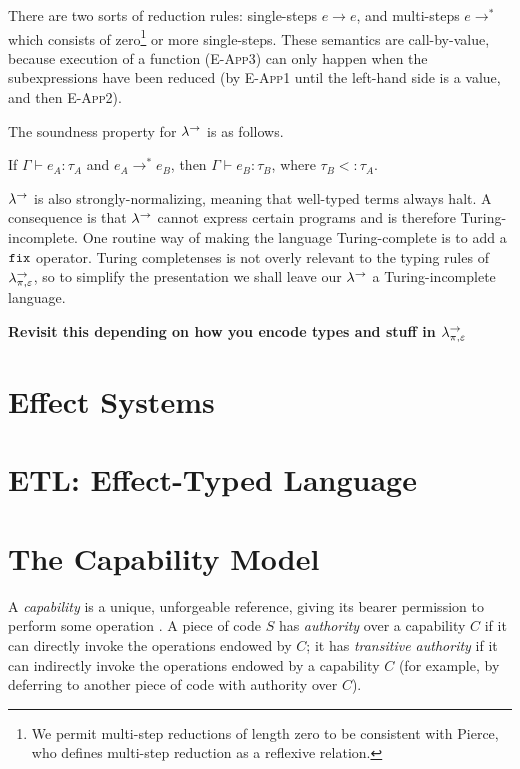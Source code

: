 There are two sorts of reduction rules: single-steps $e \longrightarrow e$, and multi-steps $e \longrightarrow^{*}$ which consists of zero\footnote{We permit multi-step reductions of length zero to be consistent with Pierce, who defines multi-step reduction as a reflexive relation\cite[p. 39]{tapl}.} or more single-steps. These semantics are call-by-value, because execution of a function (\textsc{E-App3}) can only happen when the subexpressions have been reduced (by \textsc{E-App1} until the left-hand side is a value, and then \textsc{E-App2}).

The soundness property for $\lambda^{\rightarrow}$ is as follows.

\begin{theorem}
If $\Gamma \vdash e_A: \tau_A$ and $e_A \longrightarrow^* e_B$, then $\Gamma \vdash e_B: \tau_B$, where $\tau_B <: \tau_A$.
\end{theorem}

$\lambda^{\rightarrow}$ is also strongly-normalizing, meaning that well-typed terms always halt. A consequence is that $\lambda^{\rightarrow}$ cannot express certain programs and is therefore Turing-incomplete. One routine way of making the language Turing-complete is to add a $\mathtt{fix}$ operator. Turing completenses is not overly relevant to the typing rules of $\lambda^{\rightarrow}_{\pi, \varepsilon}$, so to simplify the presentation we shall leave our $\lambda^{\rightarrow}$ a Turing-incomplete language.

\textbf{Revisit this depending on how you encode types and stuff in $\lambda^{\rightarrow}_{\pi, \varepsilon}$}


\section{Effect Systems}


\section{ETL: Effect-Typed Language}




\section{The Capability Model}

A \textit{capability} is a unique, unforgeable reference, giving its bearer permission to perform some operation \cite{dennis66}. A piece of code $S$ has \textit{authority} over a capability $C$ if it can directly invoke the operations endowed by $C$; it has \textit{transitive authority} if it can indirectly invoke the operations endowed by a capability $C$ (for example, by deferring to another piece of code with authority over $C$).

